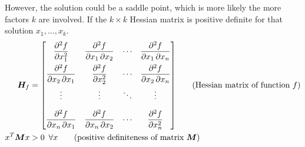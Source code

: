 \documentclass[11pt]{article}
\theoremstyle{definition}
\begin{document}
However, the solution could be a saddle point, which is more likely the more factors $k$ are involved. If the $k\times k$ Hessian matrix is positive definite for that solution $x_1,\dots,x_k$.
\begin{align*}
	\bm{H}_f &= {\begin{bmatrix}{\dfrac {\partial ^{2}f}{\partial x_{1}^{2}}}&{\dfrac {\partial ^{2}f}{\partial x_{1}\,\partial x_{2}}}&\cdots &{\dfrac {\partial ^{2}f}{\partial x_{1}\,\partial x_{n}}}\\[2.2ex]{\dfrac {\partial ^{2}f}{\partial x_{2}\,\partial x_{1}}}&{\dfrac {\partial ^{2}f}{\partial x_{2}^{2}}}&\cdots &{\dfrac {\partial ^{2}f}{\partial x_{2}\,\partial x_{n}}}\\[2.2ex]\vdots &\vdots &\ddots &\vdots \\[2.2ex]{\dfrac {\partial ^{2}f}{\partial x_{n}\,\partial x_{1}}}&{\dfrac {\partial ^{2}f}{\partial x_{n}\,\partial x_{2}}}&\cdots &{\dfrac {\partial ^{2}f}{\partial x_{n}^{2}}}\end{bmatrix}} \tag{Hessian matrix of function $f$}\\
	x^T\bm{M}x &> 0\hspace*{0.5em}\forall x \tag{positive definiteness of matrix $\bm{M}$}
\end{align*}

\clearpage
\appendix
\end{document}
